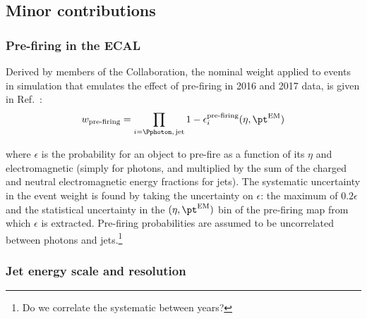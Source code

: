 

\subsection{Minor contributions}
\label{subsec:htoinv_minor_weights_systs}




\subsubsection{Pre-firing in the ECAL}
\label{subsubsec:htoinv_ecal_prefiring_weight}

Derived by members of the Collaboration, the nominal weight applied to events in simulation that emulates the effect of pre-firing in 2016 and 2017 data, is given in Ref.~:
\begin{equation}
    w_{\text{pre-firing}} = \prod_{i = \Pphoton,\, \mathrm{jet}} 1 - \epsilon_i^{\text{pre-firing}}(\eta, \pt^{\mathrm{EM}})
    \label{eq:prefiring_weight}
\end{equation}

where $\epsilon$ is the probability for an object to pre-fire as a function of its $\eta$ and electromagnetic \pt (simply \pt for photons, and \pt multiplied by the sum of the charged and neutral electromagnetic energy fractions for \glspl{jet}). The systematic uncertainty in the event weight is found by taking the uncertainty on $\epsilon$: the maximum of $\text{0.2}\epsilon$ and the statistical uncertainty in the $(\eta, \pt^{\mathrm{EM}})$ bin of the pre-firing map from which $\epsilon$ is extracted. Pre-firing probabilities are assumed to be uncorrelated between photons and jets.\footnote{Do we correlate the systematic between years?}




\subsubsection{Jet energy scale and resolution}
\label{subsubsec:htoinv_JES_JER_systs}




